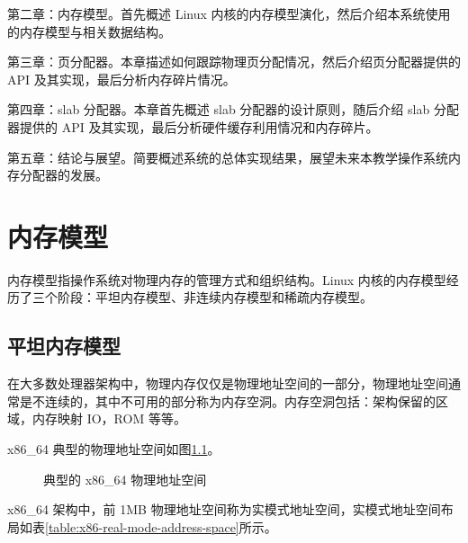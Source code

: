 \documentclass[AutoFakeBold]{LZUThesis}
\begin{document}
\begin{sloppypar}
第二章：内存模型。首先概述 Linux 内核的内存模型演化，然后介绍本系统使用的内存模型与相关数据结构。

第三章：页分配器。本章描述如何跟踪物理页分配情况，然后介绍页分配器提供的
API 及其实现，最后分析内存碎片情况。

第四章：slab 分配器。本章首先概述 slab 分配器的设计原则，随后介绍 slab
分配器提供的 API 及其实现，最后分析硬件缓存利用情况和内存碎片。

第五章：结论与展望。简要概述系统的总体实现结果，展望未来本教学操作系统内存分配器的发展。



\chapter{内存模型}

内存模型指操作系统对物理内存的管理方式和组织结构。Linux
内核的内存模型经历了三个阶段：平坦内存模型、非连续内存模型和稀疏内存模型。


\section{平坦内存模型}

在大多数处理器架构中，物理内存仅仅是物理地址空间的一部分，物理地址空间通常是不连续的，其中不可用的部分称为内存空洞。内存空洞包括：架构保留的区域，内存映射 IO，ROM 等等。

x86\_64 典型的物理地址空间如图\ref{figure:x86_64-physical-address-space}。

\begin{figure}[htb]
\centering

\caption{典型的 x86\_64 物理地址空间}
\label{figure:x86_64-physical-address-space}
\end{figure}

x86\_64 架构中，前 1MB
物理地址空间称为实模式地址空间，实模式地址空间布局如表\ref{table:x86-real-mode-address-space}所示。


\end{sloppypar}
\end{document}
